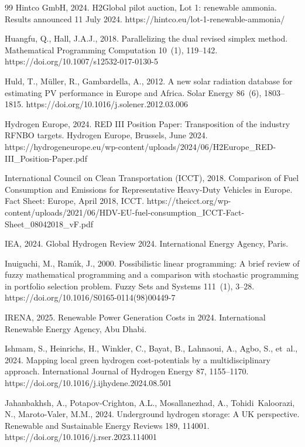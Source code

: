 \documentclass[preprint,12pt,authoryear]{elsarticle}
\begin{document}
\begin{thebibliography}{99}
Hintco GmbH, 2024. H2Global pilot auction, Lot 1: renewable ammonia. Results announced 11 July 2024. https://hintco.eu/lot-1-renewable-ammonia/

Huangfu, Q., Hall, J.A.J., 2018. Parallelizing the dual revised simplex method. Mathematical Programming Computation 10~(1), 119--142. https://doi.org/10.1007/s12532-017-0130-5

Huld, T., M{\"u}ller, R., Gambardella, A., 2012. A new solar radiation database for estimating PV performance in Europe and Africa. Solar Energy 86~(6), 1803--1815. https://doi.org/10.1016/j.solener.2012.03.006

Hydrogen Europe, 2024. RED III Position Paper: Transposition of the industry RFNBO targets. Hydrogen Europe, Brussels, June 2024. https://hydrogeneurope.eu/wp-content/uploads/2024/06/H2Europe\_RED-III\_Position-Paper.pdf

International Council on Clean Transportation (ICCT), 2018. Comparison of Fuel Consumption and Emissions for Representative Heavy-Duty Vehicles in Europe. Fact Sheet: Europe, April 2018, ICCT. https://theicct.org/wp-content/uploads/2021/06/HDV-EU-fuel-consumption\_ICCT-Fact-Sheet\_08042018\_vF.pdf

IEA, 2024. Global Hydrogen Review 2024. International Energy Agency, Paris.

Inuiguchi, M., Ram{\'\i}k, J., 2000. Possibilistic linear programming: A brief review of fuzzy mathematical programming and a comparison with stochastic programming in portfolio selection problem. Fuzzy Sets and Systems 111~(1), 3--28. https://doi.org/10.1016/S0165-0114(98)00449-7

IRENA, 2025. Renewable Power Generation Costs in 2024. International Renewable Energy Agency, Abu Dhabi.

Ishmam, S., Heinrichs, H., Winkler, C., Bayat, B., Lahnaoui, A., Agbo, S., et~al., 2024. Mapping local green hydrogen cost-potentials by a multidisciplinary approach. International Journal of Hydrogen Energy 87, 1155--1170. https://doi.org/10.1016/j.ijhydene.2024.08.501

Jahanbakhsh, A., Potapov-Crighton, A.L., Mosallanezhad, A., Tohidi~Kaloorazi, N., Maroto-Valer, M.M., 2024. Underground hydrogen storage: A UK perspective. Renewable and Sustainable Energy Reviews 189, 114001. https://doi.org/10.1016/j.rser.2023.114001


\end{thebibliography}
\end{document}
